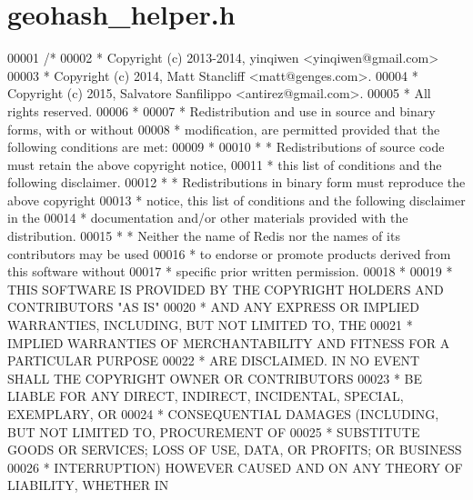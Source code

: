 \hypertarget{geohash__helper_8h_source}{}\section{geohash\+\_\+helper.\+h}
\label{geohash__helper_8h_source}

\begin{DoxyCode}
00001 \textcolor{comment}{/*}
00002 \textcolor{comment}{ * Copyright (c) 2013-2014, yinqiwen <yinqiwen@gmail.com>}
00003 \textcolor{comment}{ * Copyright (c) 2014, Matt Stancliff <matt@genges.com>.}
00004 \textcolor{comment}{ * Copyright (c) 2015, Salvatore Sanfilippo <antirez@gmail.com>.}
00005 \textcolor{comment}{ * All rights reserved.}
00006 \textcolor{comment}{ *}
00007 \textcolor{comment}{ * Redistribution and use in source and binary forms, with or without}
00008 \textcolor{comment}{ * modification, are permitted provided that the following conditions are met:}
00009 \textcolor{comment}{ *}
00010 \textcolor{comment}{ *  * Redistributions of source code must retain the above copyright notice,}
00011 \textcolor{comment}{ *    this list of conditions and the following disclaimer.}
00012 \textcolor{comment}{ *  * Redistributions in binary form must reproduce the above copyright}
00013 \textcolor{comment}{ *    notice, this list of conditions and the following disclaimer in the}
00014 \textcolor{comment}{ *    documentation and/or other materials provided with the distribution.}
00015 \textcolor{comment}{ *  * Neither the name of Redis nor the names of its contributors may be used}
00016 \textcolor{comment}{ *    to endorse or promote products derived from this software without}
00017 \textcolor{comment}{ *    specific prior written permission.}
00018 \textcolor{comment}{ *}
00019 \textcolor{comment}{ * THIS SOFTWARE IS PROVIDED BY THE COPYRIGHT HOLDERS AND CONTRIBUTORS "AS IS"}
00020 \textcolor{comment}{ * AND ANY EXPRESS OR IMPLIED WARRANTIES, INCLUDING, BUT NOT LIMITED TO, THE}
00021 \textcolor{comment}{ * IMPLIED WARRANTIES OF MERCHANTABILITY AND FITNESS FOR A PARTICULAR PURPOSE}
00022 \textcolor{comment}{ * ARE DISCLAIMED. IN NO EVENT SHALL THE COPYRIGHT OWNER OR CONTRIBUTORS}
00023 \textcolor{comment}{ * BE LIABLE FOR ANY DIRECT, INDIRECT, INCIDENTAL, SPECIAL, EXEMPLARY, OR}
00024 \textcolor{comment}{ * CONSEQUENTIAL DAMAGES (INCLUDING, BUT NOT LIMITED TO, PROCUREMENT OF}
00025 \textcolor{comment}{ * SUBSTITUTE GOODS OR SERVICES; LOSS OF USE, DATA, OR PROFITS; OR BUSINESS}
00026 \textcolor{comment}{ * INTERRUPTION) HOWEVER CAUSED AND ON ANY THEORY OF LIABILITY, WHETHER IN}

\end{DoxyCode}
